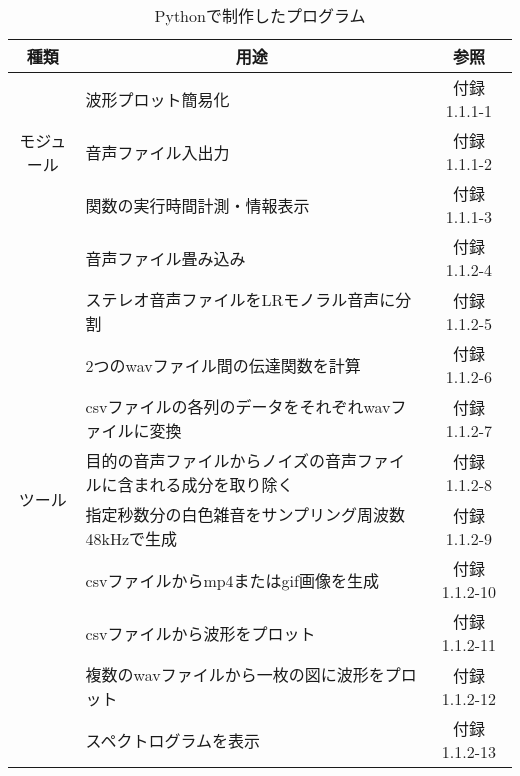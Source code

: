\begin{table}[H]
  \centering
  \caption{Pythonで制作したプログラム}
  \label{tab:program_python}
  \begin{tabular}{|c|l|c|}
  \hline
  種類                     & \multicolumn{1}{c|}{用途}           & 参照       \\ \hline
  \multirow{3}{*}{モジュール} & 波形プロット簡易化                         & 付録 1.1.1-1  \\ \cline{2-3} 
                         & 音声ファイル入出力                         & 付録 1.1.1-2  \\ \cline{2-3} 
                         & 関数の実行時間計測・情報表示                    & 付録 1.1.1-3  \\ \hline
  \multirow{10}{*}{ツール}  & 音声ファイル畳み込み                        & 付録 1.1.2-4  \\ \cline{2-3} 
                         & ステレオ音声ファイルをLRモノラル音声に分割            & 付録 1.1.2-5  \\ \cline{2-3} 
                         & 2つのwavファイル間の伝達関数を計算               & 付録 1.1.2-6  \\ \cline{2-3} 
                         & csvファイルの各列のデータをそれぞれwavファイルに変換     & 付録 1.1.2-7  \\ \cline{2-3} 
                         & 目的の音声ファイルからノイズの音声ファイルに含まれる成分を取り除く & 付録 1.1.2-8  \\ \cline{2-3} 
                         & 指定秒数分の白色雑音をサンプリング周波数48kHzで生成      & 付録 1.1.2-9  \\ \cline{2-3} 
                         & csvファイルからmp4またはgif画像を生成           & 付録 1.1.2-10 \\ \cline{2-3} 
                         & csvファイルから波形をプロット                  & 付録 1.1.2-11 \\ \cline{2-3} 
                         & 複数のwavファイルから一枚の図に波形をプロット          & 付録 1.1.2-12 \\ \cline{2-3} 
                         & スペクトログラムを表示                       & 付録 1.1.2-13 \\ \hline
  \end{tabular}
  \end{table}


